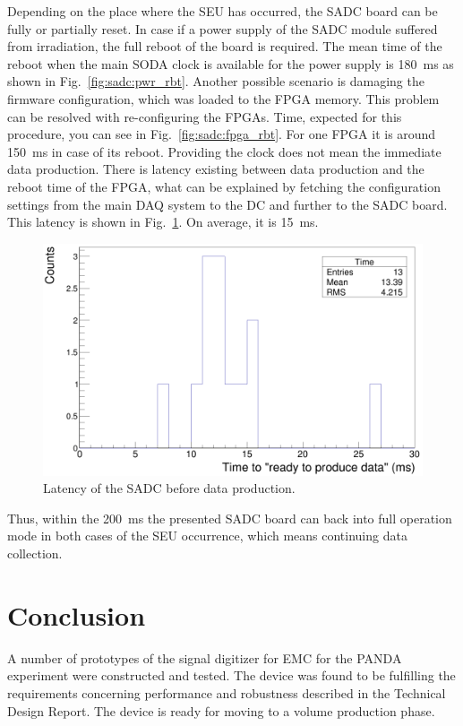 \documentclass[12pt,a4paper, twocolumn]{article}
\newcommand{\Reffig}[1]{Fig.~\ref{#1}}
\begin{document}
Depending on the place where the SEU has occurred, the SADC board can be fully or partially reset. In case if a power supply of the SADC module suffered from irradiation, the full reboot of the board is required. The mean time of the reboot when the main SODA clock is available for the power supply is \SI{180}{\milli\second} as shown in \Reffig{fig:sadc:pwr_rbt}. Another possible scenario is damaging the firmware configuration, which was loaded to the FPGA memory. This problem can be resolved with re-configuring the FPGAs. Time, expected for this procedure, you can see in \Reffig{fig:sadc:fpga_rbt}. For one FPGA it is around \SI{150}{\milli\second} in case of its reboot. Providing the clock does not mean the immediate data production. There is latency existing between data production and the reboot time of the FPGA, what can be explained by fetching the configuration settings from the main DAQ system to the DC and further to the SADC board. This latency is shown in \Reffig{fig:sadc:data_rd}. On average, it is \SI{15}{\milli\second}.
\begin{figure}[htb]
\includegraphics[width=\linewidth, trim={0 0 0 0}, clip]{fig/DataProdRd.png}
\caption{\label{fig:sadc:data_rd}Latency of the SADC before data production.}
\end{figure}
Thus, within the \SI{200}{\milli\second} the presented SADC board can back into full operation mode in both cases of the SEU occurrence, which means continuing data collection.
\section{Conclusion}
A number of prototypes of the signal digitizer for EMC for the PANDA experiment were constructed and tested. The device was found to be fulfilling the requirements concerning performance and robustness described in the Technical Design Report. The device is ready for moving to a volume production phase.


\end{document}
